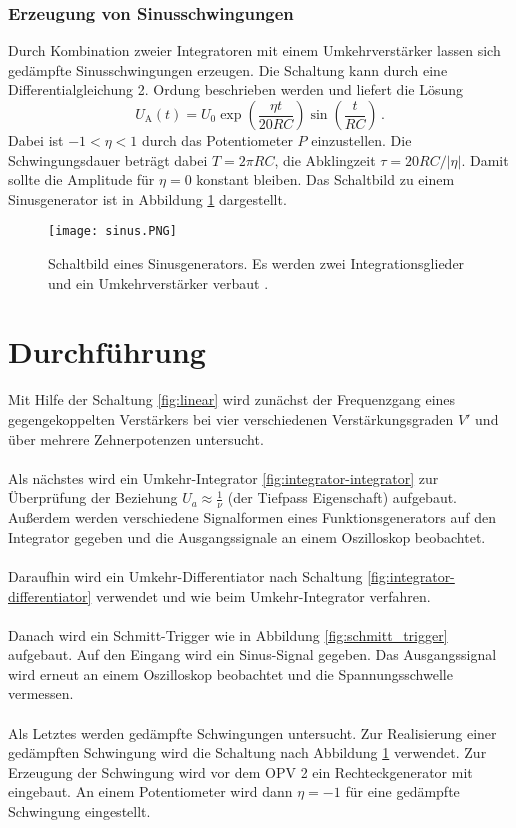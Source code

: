 \documentclass[
  bibliography=totoc,     %
  captions=tableheading,  %
  titlepage=firstiscover, %
]{scrartcl}
\begin{document}
\subsubsection{Erzeugung von Sinusschwingungen}
\label{subsubsec:sinusschwingungen}
Durch Kombination zweier Integratoren mit einem Umkehrverstärker lassen sich
gedämpfte Sinusschwingungen erzeugen.
Die Schaltung kann durch eine Differentialgleichung 2. Ordung beschrieben
werden und liefert die Lösung
\begin{equation}
    U_\text{A}(t) = U_0 \exp\!\left( \frac{\eta t}{\num{20} RC} \right)
                        \sin\!\left( \frac{t}{RC} \right)\,.
    \label{eqn:oszi}
\end{equation}
Dabei ist $\num{-1} < \eta < \num{1}$ durch das Potentiometer $P$ einzustellen.
Die Schwingungsdauer beträgt dabei $T = 2\pi RC$, die Abklingzeit
$\tau = 20 RC / |\eta|$. Damit sollte die Amplitude für $\eta = \num{0}$
konstant bleiben.
Das Schaltbild zu einem Sinusgenerator ist in Abbildung \ref{fig:sinus}
dargestellt.
\begin{figure}[H]
    \centering
    \texttt{[image: sinus.PNG]}
    \caption{
        Schaltbild eines Sinusgenerators. Es werden zwei Integrationsglieder
        und ein Umkehrverstärker verbaut \cite{V51}.
    }
    \label{fig:sinus}
\end{figure}

\section{Durchführung}
\label{sec:durchführung}


Mit Hilfe der Schaltung \ref{fig:linear} wird zunächst der Frequenzgang eines
gegengekoppelten Verstärkers bei vier verschiedenen Verstärkungsgraden $V'$
und über mehrere Zehnerpotenzen untersucht. \\
\\
\noindent
Als nächstes wird ein Umkehr-Integrator \ref{fig:integrator-integrator} zur Überprüfung der Beziehung
$U_a \approx \frac{1}{\nu}$ (der Tiefpass Eigenschaft) aufgebaut. Außerdem werden
verschiedene Signalformen eines Funktionsgenerators auf den Integrator gegeben und
die Ausgangssignale an einem Oszilloskop beobachtet. \\
\\
\noindent
Daraufhin wird ein Umkehr-Differentiator nach Schaltung \ref{fig:integrator-differentiator} verwendet
und wie beim Umkehr-Integrator verfahren. \\
\\
\noindent
Danach wird ein Schmitt-Trigger wie in Abbildung \ref{fig:schmitt_trigger} aufgebaut.
Auf den Eingang wird ein Sinus-Signal gegeben. Das Ausgangssignal wird erneut an einem
Oszilloskop beobachtet und die Spannungsschwelle vermessen. \\
\\
\noindent
Als Letztes werden gedämpfte Schwingungen untersucht. Zur Realisierung einer gedämpften
Schwingung wird die Schaltung nach Abbildung \ref{fig:sinus} verwendet. Zur Erzeugung
der Schwingung wird vor dem OPV 2 ein Rechteckgenerator mit eingebaut. An einem
Potentiometer wird dann $\eta = -1$ für eine gedämpfte Schwingung eingestellt.
\clearpage
\end{document}
